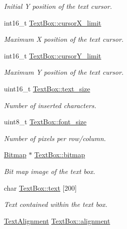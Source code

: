 \begin{DoxyCompactItemize}
\begin{DoxyCompactList}\small\item\em Initial Y position of the text cursor. \end{DoxyCompactList}\item 
int16\+\_\+t \mbox{\hyperlink{group__textbox_gaab8db5873b8af1889aaef0a088383d07}{Text\+Box\+::cursor\+X\+\_\+limit}}
\begin{DoxyCompactList}\small\item\em Maximum X position of the text cursor. \end{DoxyCompactList}\item 
int16\+\_\+t \mbox{\hyperlink{group__textbox_gaba5e128238452d3662929d023ab898cb}{Text\+Box\+::cursor\+Y\+\_\+limit}}
\begin{DoxyCompactList}\small\item\em Maximum Y position of the text cursor. \end{DoxyCompactList}\item 
uint16\+\_\+t \mbox{\hyperlink{group__textbox_ga5c78afd9fd951002d6b87a3cfffe27b8}{Text\+Box\+::text\+\_\+size}}
\begin{DoxyCompactList}\small\item\em Number of inserted characters. \end{DoxyCompactList}\item 
uint8\+\_\+t \mbox{\hyperlink{group__textbox_ga2279e6ddc6b689e797f73fbee37f2681}{Text\+Box\+::font\+\_\+size}}
\begin{DoxyCompactList}\small\item\em Number of pixels per row/column. \end{DoxyCompactList}\item 
\mbox{\hyperlink{struct_bitmap}{Bitmap}} $\ast$ \mbox{\hyperlink{group__textbox_gadde5ca94c24a93bc01b4307b51cb9e3f}{Text\+Box\+::bitmap}}
\begin{DoxyCompactList}\small\item\em Bit map image of the text box. \end{DoxyCompactList}\item 
char \mbox{\hyperlink{group__textbox_ga103b4d17950a13af1b186c09809567a3}{Text\+Box\+::text}} \mbox{[}200\mbox{]}
\begin{DoxyCompactList}\small\item\em Text contained within the text box. \end{DoxyCompactList}\item 
\mbox{\hyperlink{group__textbox_gaa56f1a82069b5feeadbb4591cb3e474f}{Text\+Alignment}} \mbox{\hyperlink{group__textbox_gaf8595fd6bcd01e16bbaab3da5474c2ed}{Text\+Box\+::alignment}}

\end{DoxyCompactItemize}
